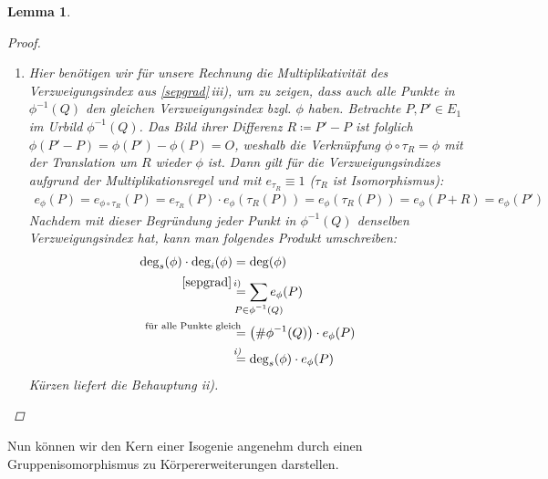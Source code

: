 \documentclass[english, german, parskip=half]{scrartcl}
\newtheorem{Lemma}[Satz]{Lemma}
\theoremstyle{definition}
\theoremstyle{remark}
\newcommand*{\degs}{\operatorname{\deg}_s} %
\newcommand*{\degi}{\operatorname{\deg}_i} %
\renewcommand{\O}{O}
\begin{document}
\begin{Lemma}
\begin{proof}
\begin{enumerate}[label=\roman*)]
    \item Hier benötigen wir für unsere Rechnung die Multiplikativität
      des Verzweigungsindex aus \autoref{sepgrad}\,iii), um zu zeigen,
      dass auch alle Punkte in $\phi^{-1}(Q)$ den gleichen
      Verzweigungsindex bzgl. $\phi$ haben.
      Betrachte $P,P'\in E_1$ im Urbild $\phi^{-1}(Q)$. Das Bild ihrer
      Differenz $R\coloneqq P'-P$ ist folglich
      $\phi(P'-P)=\phi(P')-\phi(P)=\O$, weshalb die Verknüpfung
      $\phi\circ\tau_R = \phi$ mit der Translation um $R$ wieder $\phi$
      ist.
      Dann gilt für die Verzweigungsindizes aufgrund der
      Multiplikationsregel und mit $e_{\tau_R}\equiv1$ ($\tau_R$ ist
      Isomorphismus):
      \begin{gather*}
        e_\phi(P)
        = e_{\phi\circ\tau_R}(P)
        = e_{\tau_R}(P) \cdot e_\phi(\tau_R(P))
        = e_\phi(\tau_R(P))
        = e_\phi(P+R)
        = e_\phi(P')
      \end{gather*}
      Nachdem mit dieser Begründung jeder Punkt in $\phi^{-1}(Q)$
      denselben Verzweigungsindex hat, kann man folgendes Produkt
      umschreiben:
      \begin{align*}
        \degs(\phi) \cdot \degi(\phi)
        &= \deg(\phi)\\
        &\overset{\mathllap{\ref{sepgrad}\,i)}}{=}
          \sum_{\mathclap{P\in\phi^{-1}(Q)}} e_\phi(P)\\
        &\overset{\mathllap{\text{für alle Punkte gleich}}}{=}
          \left( \#\phi^{-1}(Q) \right) \cdot e_\phi(P)\\
        &\overset{\mathllap{\text{\emph{i)}}}}{=}
          \degs(\phi)\cdot e_\phi(P)
      \end{align*}
      Kürzen liefert die Behauptung \emph{ii)}.
    \end{enumerate}  
  \end{proof}
\end{Lemma}

Nun können wir den Kern einer Isogenie angenehm durch einen
Gruppenisomorphismus zu Körpererweiterungen darstellen.
\end{document}
